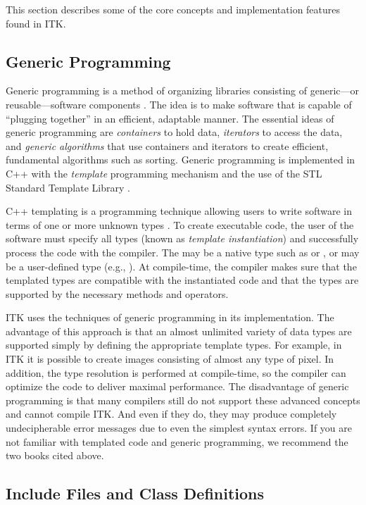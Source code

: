 This section describes some of the core concepts and implementation features
found in ITK.

\subsection{Generic Programming}
\label{sec:GenericProgramming}

Generic programming is a method of organizing libraries consisting of
generic---or reusable---software components \cite{Musser1996}. The idea is to
make software that is capable of ``plugging together'' in an efficient,
adaptable manner. The essential ideas of generic programming are
\emph{containers} to hold data, \emph{iterators} to access the data, and 
\emph{generic algorithms} that use containers and iterators to create 
efficient, fundamental algorithms such as sorting. Generic programming is
implemented in C++ with the \emph{template} programming mechanism and the 
use of the STL Standard Template Library \cite{Austern1999}.

C++ templating is a programming technique allowing users to write software in
terms of one or more unknown types . To create executable code, the
user of the software must specify all types  (known as \emph{template
instantiation}) and successfully process the code with the compiler. The
 may be a native type such as
 or , or  may be a user-defined type (e.g.,
). At compile-time, the compiler makes sure that the templated 
types are compatible with the instantiated code and that the types are
supported by the necessary methods and operators.

ITK uses the techniques of generic programming in its implementation. The
advantage of this approach is that an almost unlimited variety of data types
are supported simply by defining the appropriate template types. For example,
in ITK it is possible to create images consisting of almost any type of
pixel. In addition, the type resolution is performed at compile-time, so the
compiler can optimize the code to deliver maximal performance. The
disadvantage of generic programming is that many compilers still do not
support these advanced concepts and cannot compile ITK. And even if they do,
they may produce completely undecipherable error messages due to even the
simplest syntax errors. If you are not familiar with templated code and
generic programming, we recommend the two books cited above.

\subsection{Include Files and Class Definitions}
\label{sec:IncludeFiles}

